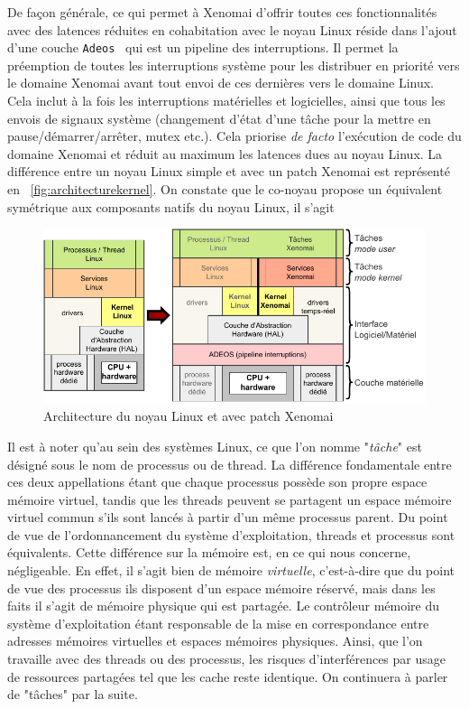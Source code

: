 \documentclass[french, a4paper, 11pt, twoside, pdftex]{StyleThese}
\begin{document}
    	De façon générale, ce qui permet à Xenomai d'offrir toutes ces fonctionnalités avec des latences réduites en cohabitation avec le noyau Linux réside dans l'ajout d'une couche \texttt{Adeos}~\cite{gerum2005life} qui est un pipeline des  interruptions. Il permet la préemption de toutes les interruptions système pour les distribuer en priorité vers le domaine Xenomai avant tout envoi de ces dernières vers le domaine Linux. Cela inclut à la fois les interruptions matérielles et logicielles, ainsi que tous les envois de signaux système (changement d'état d'une tâche pour la mettre en pause/démarrer/arrêter, mutex etc.). Cela priorise \textit{de facto} l'exécution de code du domaine Xenomai et réduit au maximum les latences dues au noyau Linux. La différence entre un noyau Linux simple et avec un patch Xenomai est représenté en ~\autoref{fig:architecturekernel}. On constate que le co-noyau propose un équivalent symétrique aux composants natifs du noyau Linux, il s'agit 

		\begin{figure}[h]
			\centering
			\includegraphics[width=\linewidth]{schemas/Architecture_kernel}
			\caption[Architecture co-noyau Linux et Xenomai]{Architecture du noyau Linux et avec patch Xenomai}
			\label{fig:architecturekernel}
		\end{figure}
    	
		Il est à noter qu'au sein des systèmes Linux, ce que l'on nomme "\textit{tâche}" est désigné sous le nom de processus ou de thread. La différence fondamentale entre ces deux appellations étant que chaque processus possède son propre espace mémoire virtuel, tandis que les threads peuvent se partagent un espace mémoire virtuel commun s'ils sont lancés à partir d'un même processus parent. Du point de vue de l'ordonnancement du système d'exploitation, threads et processus sont équivalents. Cette différence sur la mémoire est, en ce qui nous concerne, négligeable. En effet, il s'agit bien de mémoire \textit{virtuelle}, c'est-à-dire que du point de vue des processus ils disposent d'un espace mémoire réservé, mais dans les faits il s'agit de mémoire physique qui est partagée. Le contrôleur mémoire du système d'exploitation étant responsable de la mise en correspondance entre adresses mémoires virtuelles et espaces mémoires physiques. Ainsi, que l'on travaille avec des threads ou des processus, les risques d'interférences par usage de ressources partagées tel que les cache reste identique. On continuera à parler de "tâches" par la suite.
		
\end{document}

